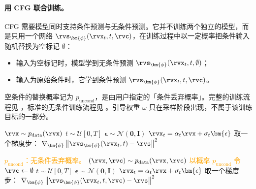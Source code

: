 \paragraph{用 CFG 联合训练。}
CFG 需要模型同时支持条件预测与无条件预测。它并不训练两个独立的模型，而是只用一个网络 $\rvs_{\bm{\phi}}(\rvx_t,t,\rvc)$，在训练过程中以一定概率把条件输入随机替换为空标记 $\emptyset$：
\begin{itemize}
    \item 输入为空标记时，模型学到无条件预测
    $\rvs_{\bm{\phi}}(\rvx_t,t,\emptyset)$；
    \item 输入为原始条件时，它学到条件预测
    $\rvs_{\bm{\phi}}(\rvx_t,t,\rvc)$。
\end{itemize}
空条件的替换概率记为 $p_\mathrm{uncond}$，是由用户指定的「条件丢弃概率」。完整的训练流程见
，标准的无条件训练流程见
。引导权重 $\omega$ 只在采样阶段出现，不属于该训练目标的一部分。\begin{center}
\begin{minipage}[t]{0.48\textwidth}
  \begin{algorithm}[H]
  {\small
    {\small \caption{Uncond。 DM \label{alg:no_cfg_training} }}
    \begin{algorithmic}[1]
      \Repeat
        \State $\rvx \sim p_{\text{data}}(\rvx)$
        \State $t \sim \mathcal{U}[0, T]$
        \State $\bm{\epsilon} \sim \mathcal{N}(\mathbf{0}, \mathbf{I})$
        \State $\rvx_t = \alpha_t \rvx + \sigma_t \bm{\epsilon}$
        \State 取一个梯度步：
        \Statex \quad $\nabla_{\bm{\phi}} \left\| \rvs_{\bm{\phi}}(\rvx_t, t) - \rvs \right\|^2$
    \end{algorithmic}
    }
  \end{algorithm}
\end{minipage}
\hfill
\begin{minipage}[t]{0.48\textwidth}
  \begin{algorithm}[H]
      {\small
    {\small \caption{用于条件扩散模型（DM）的 CFG 训练 \label{alg:cfg_training}}}
    \begin{algorithmic}[1]
      \Require \textcolor{orange}{$p_\mathrm{uncond}$：无条件丢弃概率。}
      \Repeat
        \State \textcolor{orange}{$(\rvx, \rvc) \sim p_{\text{data}}(\rvx, \rvc)$}
        \State \textcolor{orange}{以概率 $p_\mathrm{uncond}$ 令 $\rvc \gets \emptyset$}
        \State $t \sim \mathcal{U}[0, T]$
        \State $\bm{\epsilon} \sim \mathcal{N}(\mathbf{0}, \mathbf{I})$
        \State $\rvx_t = \alpha_t \rvx + \sigma_t \bm{\epsilon}$
        \State 取一个梯度步：
        \Statex \quad \textcolor{orange}{$\nabla_{\bm{\phi}} \left\| \rvs_{\bm{\phi}}(\rvx_t, t, \rvc) - \rvs \right\|^2$}
    \end{algorithmic}
    }
  \end{algorithm}
\end{minipage}
\end{center}

